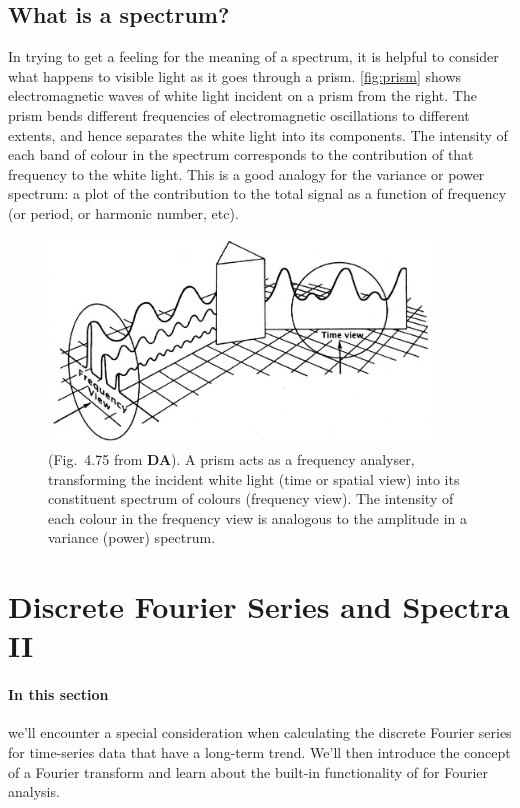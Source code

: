 \documentclass[11pt,twoside,a4paper]{article}
\begin{document}
\subsection{What is a spectrum?}

In trying to get a feeling for the meaning of a spectrum, it is
helpful to consider what happens to visible light as it goes through a
prism. \autoref{fig:prism} shows electromagnetic waves of white light
incident on a prism from the right.  The prism bends different
frequencies of electromagnetic oscillations to different extents, and
hence separates the white light into its components.  The intensity of
each band of colour in the spectrum corresponds to the contribution of
that frequency to the white light.  This is a good analogy for the
variance or power spectrum: a plot of the contribution to the total
signal as a function of frequency (or period, or harmonic number,
etc).

\begin{figure}
  \centering
  \includegraphics[width=4in]{../figs/L16/FourierPrism}
  \caption{(Fig.~4.75 from \textbf{DA}). A prism acts as a frequency
    analyser, transforming the incident white light (time or spatial
    view) into its constituent spectrum of colours (frequency
    view). The intensity of each colour in the frequency view is
    analogous to the amplitude in a variance (power) spectrum.
    \vspace{5mm}}
  \label{fig:prism}
\end{figure}


\section{Discrete Fourier Series and Spectra II}
\label{sec:intro_timeseries}

\paragraph{In this section} we'll encounter a special consideration
when calculating the discrete Fourier series for time-series data that
have a long-term trend. We'll then introduce the concept of a Fourier
transform and learn about the built-in functionality of \Mlab for
Fourier analysis.
\end{document}
